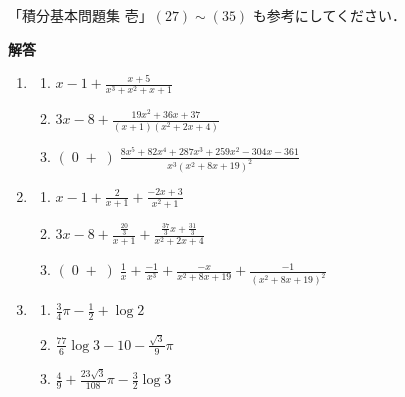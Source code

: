 \documentclass[10pt, uplatex, dvipdfmx]{jsarticle}
\theoremstyle{definition}
\numberwithin{equation}{section}
\newcommand{\ds}{\displaystyle}
\begin{document}
\vspace{2zh}


「積分基本問題集 壱」$(27) \sim (35)$ も参考にしてください．

\newpage

\begin{center}
  \textbf{解答}
\end{center}

\begin{enumerate}
  \setlength{\itemsep}{2zh}
\item
  \begin{enumerate}[(1)]
    \setlength{\itemsep}{2zh}
    
  \item $\ds x-1 + \frac{x+5}{x^3+x^2+x+1}$

  \item $\ds 3x-8 + \frac{19x^2+36x+37}{(x+1)(x^2+2x+4)}$

  \item $\ds  (\; 0 \; + \; ) \; \frac{8x^5 + 82 x^4 + 287 x^3 + 259 x^2 -304 x -361}{x^3 (x^2+8x+19)^2}$
  \end{enumerate}

\item
  \begin{enumerate}[(1)]
    \setlength{\itemsep}{2zh}
    
  \item $\ds x-1 + \frac{2}{x+1} + \frac{-2x+3}{x^2+1}$

  \item $\ds 3x-8 + \frac{\frac{20}{3}}{x+1} + \frac{\frac{37}{3} x + \frac{31}{3}}{x^2+2x+4}$

  \item $\ds ( \; 0 \; + \; ) \; \frac{1}{x} + \frac{-1}{x^3} + \frac{-x}{x^2+8x+19} + \frac{-1}{(x^2+8x+19)^2}$
  \end{enumerate}

\item
  \begin{enumerate}[(1)]

    \setlength{\itemsep}{2zh}
    
  \item $\ds \frac{3}{4}\pi - \frac{1}{2} + \log 2$
    
  \item $\ds \frac{77}{6}\log 3 -10 - \frac{\sqrt{3}}{9} \pi$
    
  \item $\ds \frac{4}{9} + \frac{23\sqrt{3}}{108} \pi - \frac{3}{2} \log 3$
  \end{enumerate}
\end{enumerate}
\end{document}
